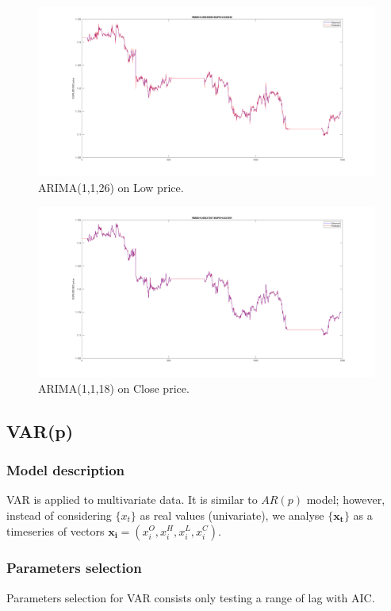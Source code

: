 \documentclass[11pt]{article}
\begin{document}
\begin{figure}[H]
  \centering
  \includegraphics[width=\linewidth,keepaspectratio]{figs/arima_26_1_1_low.png}
  \caption{ARIMA(1,1,26) on Low price.}
\end{figure}

\begin{figure}[H]
  \centering
  \includegraphics[width=\linewidth,keepaspectratio]{figs/arima_1_1_18_close.png}
  \caption{ARIMA(1,1,18) on Close price.}
\end{figure}


\subsection{VAR(p)}
\subsubsection{Model description}
VAR is applied to multivariate data. It is similar to $AR(p)$ model; however,
instead of considering $\{x_t\}$ as real values (univariate), we analyse
$\{\mathbf{x_t}\}$ as a timeseries of vectors $\mathbf{x_i}=(x_i^O, x_i^H, x_i^L, x_i^C)$. 

\subsubsection{Parameters selection}
Parameters selection for VAR consists only testing a range of lag with AIC. 
\end{document}
